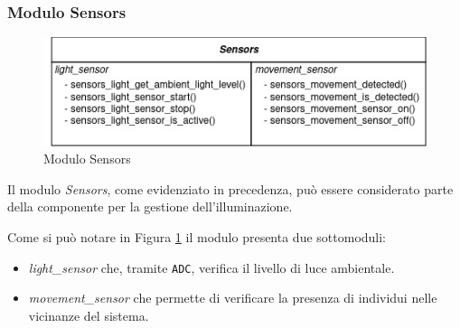 \documentclass{article}
\begin{document}
	\subsubsection{Modulo Sensors}
	\begin{figure}[ht]
		\centering
		\includegraphics[scale=0.5]{./images/Sensors.jpg}
		\caption{Modulo Sensors}
		\label{img:sensors}
	\end{figure}
	\noindent Il modulo \textit{Sensors}, come evidenziato in precedenza, pu\`o essere considerato parte della componente per la gestione dell'illuminazione.
	
	\noindent Come si pu\`o notare in Figura \ref{img:sensors} il modulo presenta due sottomoduli:
	\begin{itemize}
			\item \textit{light\_sensor} che, tramite \texttt{ADC}, verifica il livello di luce ambientale.
			\item \textit{movement\_sensor} che permette di verificare la presenza di individui nelle vicinanze del sistema.
	\end{itemize}
	\newpage
	
\end{document}
